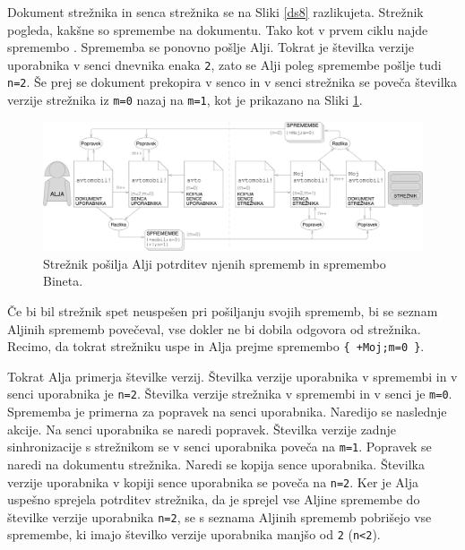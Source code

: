 \documentclass[a4paper, 12pt, twoside]{book}
\begin{document}
Dokument strežnika in senca strežnika se na Sliki \ref{ds8} razlikujeta. Strežnik pogleda, kakšne so spremembe na dokumentu. Tako kot v prvem ciklu najde spremembo . Sprememba se ponovno pošlje Alji. Tokrat je številka verzije uporabnika v senci dnevnika enaka {\tt 2}, zato se Alji poleg spremembe pošlje tudi {\tt n=2}. Še prej se dokument prekopira v senco in v senci strežnika se poveča številka verzije strežnika iz {\tt m=0} nazaj na {\tt m=1}, kot je prikazano na Sliki \ref{ds9}.

\begin{figure}[placement h]
\begin{center}
\includegraphics[width=16cm]{img/ds9.pdf}
\end{center}
\caption{Strežnik pošilja Alji potrditev njenih sprememb in spremembo Bineta.}
\label{ds9}
\end{figure}

Če bi bil strežnik spet neuspešen pri pošiljanju svojih sprememb, bi se seznam Aljinih sprememb povečeval, vse dokler ne bi dobila odgovora od strežnika. Recimo, da tokrat strežniku uspe in Alja prejme spremembo {\tt \{ +Moj;m=0 \}}.

Tokrat Alja primerja številke verzij. Številka verzije uporabnika v spremembi in v senci uporabnika je {\tt n=2}. Številka verzije strežnika v spremembi in v senci je {\tt m=0}. Sprememba je primerna za popravek na senci uporabnika. Naredijo se naslednje akcije. Na senci uporabnika se naredi popravek. Številka verzije zadnje sinhronizacije s strežnikom se v senci uporabnika poveča na {\tt m=1}. Popravek se naredi na dokumentu strežnika. Naredi se kopija sence uporabnika. Številka verzije uporabnika v kopiji sence uporabnika se poveča na {\tt n=2}. Ker je Alja uspešno sprejela potrditev strežnika, da je sprejel vse Aljine spremembe do številke verzije uporabnika {\tt n=2}, se s seznama Aljinih sprememb pobrišejo vse spremembe, ki imajo številko verzije uporabnika manjšo od {\tt 2} ({\tt n<2}).
\end{document}
